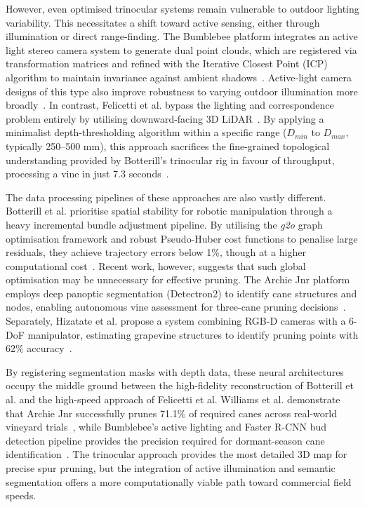 However, even optimised trinocular systems remain vulnerable to outdoor lighting variability. This necessitates a shift toward active sensing, either through illumination or direct range-finding. The Bumblebee platform integrates an active light stereo camera system to generate dual point clouds, which are registered via transformation matrices and refined with the Iterative Closest Point (ICP) algorithm to maintain invariance against ambient shadows~\cite{silwalBumblebeePath2022}. Active-light camera designs of this type also improve robustness to varying outdoor illumination more broadly~\cite{silwalRobustIlluminationInvariantCamera2021}. In contrast, Felicetti et al. bypass the lighting and correspondence problem entirely by utilising downward-facing 3D LiDAR~\cite{felicettiTractorMountedGrapevine2025}. By applying a minimalist depth-thresholding algorithm within a specific range ($D_{min}$ to $D_{max}$, typically 250--500 mm), this approach sacrifices the fine-grained topological understanding provided by Botterill's trinocular rig in favour of throughput, processing a vine in just 7.3 seconds~\cite{felicettiTractorMountedGrapevine2025, botterillRobotSystemPruning2017}.

The data processing pipelines of these approaches are also vastly different. Botterill et al. prioritise spatial stability for robotic manipulation through a heavy incremental bundle adjustment pipeline. By utilising the \textit{g2o} graph optimisation framework and robust Pseudo-Huber cost functions to penalise large residuals, they achieve trajectory errors below 1\%, though at a higher computational cost~\cite{botterillRobotSystemPruning2017}. Recent work, however, suggests that such global optimisation may be unnecessary for effective pruning. The Archie Jnr platform employs deep panoptic segmentation (Detectron2) to identify cane structures and nodes, enabling autonomous vine assessment for three-cane pruning decisions~\cite{williamsArchieJnrRobotic2024}. Separately, Hizatate et al. propose a system combining RGB-D cameras with a 6-DoF manipulator, estimating grapevine structures to identify pruning points with 62\% accuracy~\cite{hizatateDevelopmentRobotPruning2025}.

By registering segmentation masks with depth data, these neural architectures occupy the middle ground between the high-fidelity reconstruction of Botterill et al. and the high-speed approach of Felicetti et al. Williams et al. demonstrate that Archie Jnr successfully prunes 71.1\% of required canes across real-world vineyard trials~\cite{williamsArchieJnrRobotic2024}, while Bumblebee's active lighting and Faster R-CNN bud detection pipeline provides the precision required for dormant-season cane identification~\cite{silwalBumblebeePath2022}. The trinocular approach provides the most detailed 3D map for precise spur pruning, but the integration of active illumination and semantic segmentation offers a more computationally viable path toward commercial field speeds.


